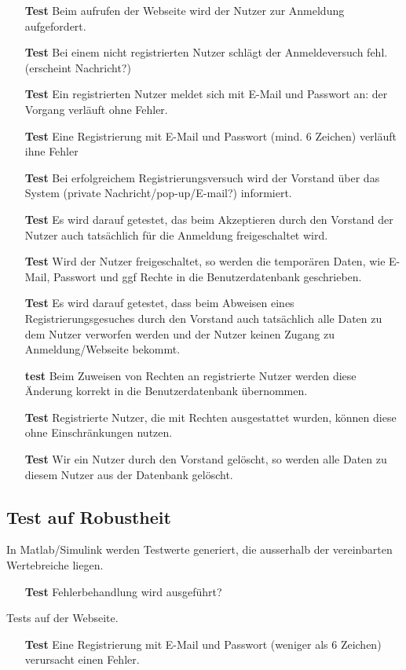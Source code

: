 \documentclass[fontsize = 12pt, paper = a4]{scrreprt}
\begin{document}
\begin{itemize}
\item[\textbf{Test}] Beim aufrufen der Webseite wird der Nutzer zur Anmeldung aufgefordert.
\item[\textbf{Test}] Bei einem nicht registrierten Nutzer schlägt der Anmeldeversuch fehl. (erscheint Nachricht?)
\item[\textbf{Test}] Ein registrierten Nutzer meldet sich mit E-Mail und Passwort an: der Vorgang verläuft ohne Fehler.
\item[\textbf{Test}] Eine Registrierung mit E-Mail und Passwort (mind. 6 Zeichen) verläuft ihne Fehler
\item[\textbf{Test}] Bei erfolgreichem Registrierungsversuch wird der Vorstand über das System (private Nachricht/pop-up/E-mail?) informiert.
\item[\textbf{Test}] Es wird darauf getestet, das beim Akzeptieren durch den Vorstand der Nutzer auch tatsächlich für die Anmeldung freigeschaltet wird.
\item[\textbf{Test}] Wird der Nutzer freigeschaltet, so werden die temporären Daten, wie E-Mail, Passwort und ggf Rechte in die Benutzerdatenbank geschrieben.
\item[\textbf{Test}] Es wird darauf getestet, dass beim Abweisen eines Registrierungsgesuches durch den Vorstand auch tatsächlich alle Daten zu dem Nutzer verworfen werden und der Nutzer keinen Zugang zu Anmeldung/Webseite bekommt. 
\item[\textbf{test}] Beim Zuweisen von Rechten an registrierte Nutzer werden diese Änderung korrekt in die Benutzerdatenbank übernommen.
\item[\textbf{Test}] Registrierte Nutzer, die mit Rechten ausgestattet wurden, können diese ohne Einschränkungen nutzen.
\item[\textbf{Test}] Wir ein Nutzer durch den Vorstand gelöscht, so werden alle Daten zu diesem Nutzer aus der Datenbank gelöscht.
\end{itemize}


\subsection*{Test auf Robustheit}
In Matlab/Simulink werden Testwerte generiert, die ausserhalb der vereinbarten Wertebreiche liegen. 

\begin{itemize}
\item[\textbf{Test}] Fehlerbehandlung wird ausgeführt?
\end{itemize}

Tests auf der Webseite.

\begin{itemize}
\item[\textbf{Test}] Eine Registrierung mit E-Mail und Passwort (weniger als 6 Zeichen) verursacht einen Fehler.
\end{itemize}

\end{document}
